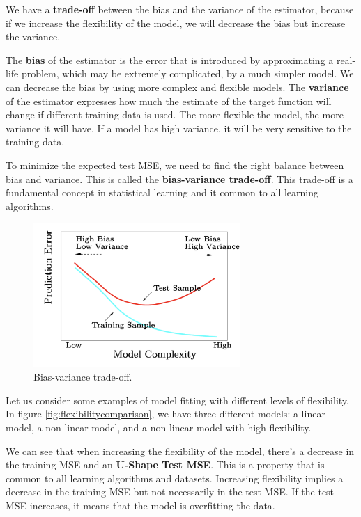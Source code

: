 We have a \textbf{trade-off} between the bias and the variance of the estimator, because if we increase the flexibility of the model, we will decrease the bias but increase the variance. 

The \textbf{bias} of the estimator is the error that is introduced by approximating a real-life problem, which may be extremely complicated, by a much simpler model. We can decrease the bias by using more complex and flexible models. The \textbf{variance} of the estimator expresses how much the estimate of the target function will change if different training data is used. The more flexible the model, the more variance it will have. If a model has high variance, it will be very sensitive to the training data. 

To minimize the expected test MSE, we need to find the right balance between bias and variance. This is called the \textbf{bias-variance trade-off}. This trade-off is a fundamental concept in statistical learning and it common to all learning algorithms.

\begin{figure}[H]
    \centering
    \includegraphics[width=0.7\textwidth]{./figures/intro/biasvariancetradeoff.png}
    \caption{Bias-variance trade-off.}
    \label{fig:biasvariancetradeoff}
\end{figure}

Let us consider some examples of model fitting with different levels of flexibility. In figure \ref*{fig:flexibilitycomparison}, we have three different models: a linear model, a non-linear model, and a non-linear model with high flexibility. 

We can see that when increasing the flexibility of the model, there's a decrease in the training MSE and an \textbf{U-Shape Test MSE}. This is a property that is common to all learning algorithms and datasets. Increasing flexibility implies a decrease in the training MSE but not necessarily in the test MSE. If the test MSE increases, it means that the model is overfitting the data.

